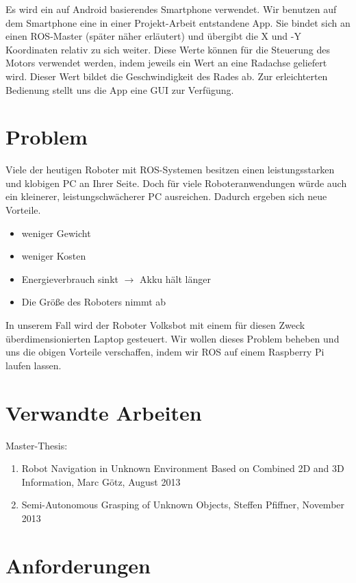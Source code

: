 \documentclass[12pt]{article}
\begin{document}
Es wird ein auf Android basierendes Smartphone verwendet.
Wir benutzen auf dem Smartphone eine in einer Projekt-Arbeit entstandene App.
Sie bindet sich an einen ROS-Master (später näher erläutert) und übergibt die X und -Y Koordinaten relativ zu sich weiter.
Diese Werte können für die Steuerung des Motors verwendet werden, indem jeweils ein Wert an eine Radachse geliefert wird. Dieser Wert bildet die Geschwindigkeit des Rades ab.
Zur erleichterten Bedienung stellt uns die App eine GUI zur Verfügung. 

\section{Problem}

Viele der heutigen Roboter mit ROS-Systemen besitzen einen leistungsstarken und klobigen PC an Ihrer Seite.
Doch für viele Roboteranwendungen würde auch ein kleinerer, leistungschwächerer PC ausreichen.
Dadurch ergeben sich neue Vorteile.

\begin{itemize}
\item weniger Gewicht
\item weniger Kosten
\item Energieverbrauch sinkt $\rightarrow$ Akku hält länger
\item Die Größe des Roboters nimmt ab
\end{itemize}

In unserem Fall wird der Roboter Volksbot mit einem für diesen Zweck überdimensionierten Laptop gesteuert. Wir wollen dieses Problem beheben und uns die obigen Vorteile verschaffen, indem wir ROS auf einem Raspberry Pi laufen lassen.

\section{Verwandte Arbeiten}

Master-Thesis:
\begin{enumerate}

\item Robot Navigation in Unknown Environment Based on Combined 2D and 3D Information, Marc Götz, August 2013
\item Semi-Autonomous Grasping of Unknown Objects, Steffen Pfiffner, November 2013
\end{enumerate}

\section{Anforderungen}
\end{document}
